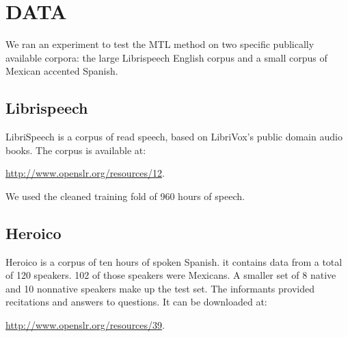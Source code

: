 \section{DATA}
\label{sec-3}

We ran an experiment to test the \gls{MTL} method on two specific publically available corpora: the large Librispeech English corpus and a small corpus of Mexican accented Spanish. 



\subsection{Librispeech}
\label{sec-3-1}
LibriSpeech is a corpus of read speech, based on LibriVox's public domain audio books.
The corpus is available at:

\url{http://www.openslr.org/resources/12}.

We used the cleaned training fold of 960 hours of speech. 

\subsection{Heroico}
\label{sec-hero}

Heroico is a corpus of ten hours of spoken Spanish.
it contains data from a total of 120 speakers.
102 of those speakers were Mexicans.
A smaller set of 8 native and 10 nonnative speakers make up the test set. 
The informants provided recitations and answers to questions. 
It can be downloaded at:

\url{http://www.openslr.org/resources/39}.
